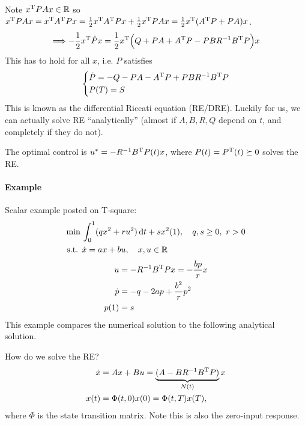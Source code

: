 Note $x^\text{T} PAx\in\mathbb{R}$ so $x^\text{T} PAx = x^\text{T} A^\text{T} Px = \frac12 x^\text{T} A^\text{T} Px + \frac12 x^\text{T} PAx = \frac12 x^\text{T} (A^\text{T} P + PA)x$.
\begin{gather}
  \Longrightarrow -\frac12 x^\text{T} \dot P x = \frac12 x^\text{T} \Big( Q + PA + A^\text{T} P - PBR^{-1}B^\text{T} P \Big) x
\end{gather}
This has to hold for all $x$, i.e. $P$ satisfies
\begin{gather}
  \begin{dcases}
    \dot P = - Q - PA - A^\text{T} P + PBR^{-1}B^\text{T} P \\
    P(T) = S
  \end{dcases}
\end{gather}
This is known as the differential Riccati equation (RE/DRE). Luckily for us, we can actually solve RE ``analytically'' (almost if $A,B,R,Q$ depend on $t$, and completely if they do not).

\begin{thm}
  The optimal control is $u^* = -R^{-1}B^\text{T} P(t) x$, where $P(t)=P^\text{T}(t)\succeq 0$ solves the RE.
\end{thm}

\paragraph{Example} Scalar example posted on T-square:
\begin{align}
  \min {} & \int_0^1 (qx^2 + ru^2)\dif t + sx^2(1), \quad q,s\ge 0,\ r>0 \\
  \text{s.t. } & \dot x = ax + bu, \quad x,u\in\R
\end{align}
\begin{align}
  u &= -R^{-1}B^\text{T} Px = -\frac{bp}{r} x \\
  \dot p &= -q - 2ap + \frac{b^2}{r}p^2 \\
  p(1) &= s
\end{align}
This example compares the numerical solution to the following analytical solution.

How do we solve the RE?
\begin{align}
  \dot x &= Ax + Bu = \underbrace{(A-BR^{-1}B^\text{T} P)}_{N(t)} x \\
  x(t) &= \Phi(t,0) x(0) = \Phi(t,T) x(T),
\end{align}
where $\Phi$ is the state transition matrix. Note this is also the zero-input response.

